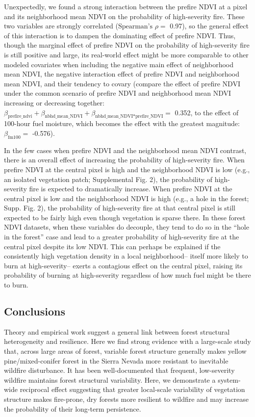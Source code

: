 \documentclass[]{article}
\begin{document}
Unexpectedly, we found a strong interaction between the prefire NDVI at
a pixel and its neighborhood mean NDVI on the probability of
high-severity fire. These two variables are strongly correlated
(\(\text{Spearman's }\rho=\) 0.97), so the general effect of this
interaction is to dampen the dominating effect of prefire NDVI. Thus,
though the marginal effect of prefire NDVI on the probability of
high-severity fire is still positive and large, its real-world effect
might be more comparable to other modeled covariates when including the
negative main effect of neighborhood mean NDVI, the negative interaction
effect of prefire NDVI and neighborhood mean NDVI, and their tendency to
covary (compare the effect of prefire NDVI under the common scenario of
prefire NDVI and neighborhood mean NDVI increasing or decreasing
together:
\(\beta_{\text{prefire\_ndvi}}+\beta_{\text{nbhd\_mean\_NDVI}}+\beta_{\text{nbhd\_mean\_NDVI*prefire\_NDVI}}=\)
0.352, to the effect of 100-hour fuel moisture, which becomes the effect
with the greatest magnitude: \(\beta_{\text{fm100}}=\) -0.576).

In the few cases when prefire NDVI and the neighborhood mean NDVI
contrast, there is an overall effect of increasing the probability of
high-severity fire. When prefire NDVI at the central pixel is high and
the neighborhood NDVI is low (e.g., an isolated vegetation patch;
Supplemental Fig. 2), the probability of high-severity fire is expected
to dramatically increase. When prefire NDVI at the central pixel is low
and the neighborhood NDVI is high (e.g., a hole in the forest; Supp.
Fig. 2), the probability of high-severity fire at that central pixel is
still expected to be fairly high even though vegetation is sparse there.
In these forest NDVI datasets, when these variables do decouple, they
tend to do so in the ``hole in the forest'' case and lead to a greater
probability of high-severity fire at the central pixel despite its low
NDVI. This can perhaps be explained if the consistently high vegetation
density in a local neighborhood-- itself more likely to burn at
high-severity-- exerts a contagious effect on the central pixel, raising
its probability of burning at high-severity regardless of how much fuel
might be there to burn.

\hypertarget{conclusions}{%
\subsection{Conclusions}\label{conclusions}}

Theory and empirical work suggest a general link between forest
structural heterogeneity and resilience. Here we find strong evidence
with a large-scale study that, across large areas of forest, variable
forest structure generally makes yellow pine/mixed-conifer forest in the
Sierra Nevada more resistant to inevitable wildfire disturbance. It has
been well-documented that frequent, low-severity wildfire maintains
forest structural variability. Here, we demonstrate a system-wide
reciprocal effect suggesting that greater local-scale variability of
vegetation structure makes fire-prone, dry forests more resilient to
wildfire and may increase the probability of their long-term
persistence.
\end{document}
